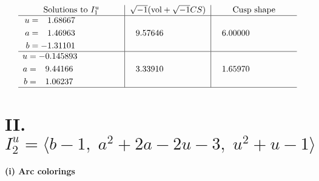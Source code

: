 \documentclass[1p]{elsarticle_modified}
\theoremstyle{definition}
\newcommand{\I}{\sqrt{-1}}
\begin{document}
$$\begin{array}{c|c|c}
\text{Solutions to }I^u_{1}& \I (\text{vol} + \sqrt{-1}CS) & \text{Cusp shape}\\
 \hline 
\begin{aligned}
u &= \phantom{-}1.68667\phantom{ +0.000000I} \\
a &= \phantom{-}1.46963\phantom{ +0.000000I} \\
b &= -1.31101\phantom{ +0.000000I}\end{aligned}
 & \phantom{-}9.57646\phantom{ +0.000000I} & \phantom{-}6.00000\phantom{ +0.000000I} \\ \hline\begin{aligned}
u &= -0.145893\phantom{ +0.000000I} \\
a &= \phantom{-}9.44166\phantom{ +0.000000I} \\
b &= \phantom{-}1.06237\phantom{ +0.000000I}\end{aligned}
 & \phantom{-}3.33910\phantom{ +0.000000I} & \phantom{-}1.65970\phantom{ +0.000000I}\\
 \hline 
 \end{array}$$\newpage\newpage\renewcommand{\arraystretch}{1}
\centering \section*{II. $I^u_{2}= \langle b-1,\;a^2+2 a-2 u-3,\;u^2+u-1 \rangle$}
\flushleft \textbf{(i) Arc colorings}\\
\end{document}
